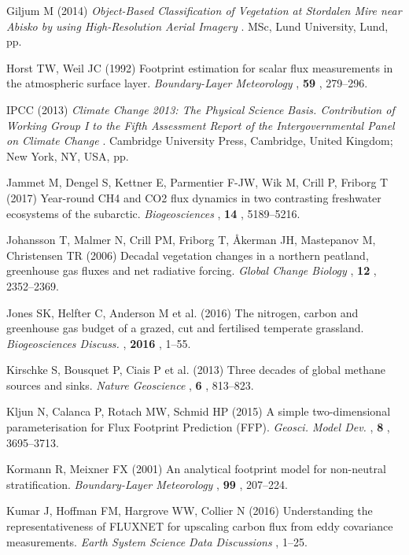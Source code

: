 \hypertarget{ref-Giljum2014}{}
Giljum M (2014) \emph{\textup{Object-Based Classification of Vegetation
at Stordalen Mire near Abisko by using High-Resolution Aerial Imagery}} .
MSc, Lund University, Lund, pp.

\hypertarget{ref-Horst1992}{}
Horst TW, Weil JC (1992) Footprint estimation for scalar flux
measurements in the atmospheric surface layer. \emph{Boundary-Layer
Meteorology} , \textbf{59} , 279--296.

\hypertarget{ref-IPCC2013}{}
IPCC (2013) \emph{\textup{Climate Change 2013: The Physical Science
Basis. Contribution of Working Group I to the Fifth Assessment Report of
the Intergovernmental Panel on Climate Change}} . Cambridge University
Press, Cambridge, United Kingdom; New York, NY, USA, pp.

\hypertarget{ref-Jammet2017}{}
Jammet M, Dengel S, Kettner E, Parmentier F-JW, Wik M, Crill P, Friborg
T (2017) Year-round CH4 and CO2 flux dynamics in two contrasting
freshwater ecosystems of the subarctic. \emph{Biogeosciences} ,
\textbf{14} , 5189--5216.

\hypertarget{ref-Johansson2006}{}
Johansson T, Malmer N, Crill PM, Friborg T, Åkerman JH, Mastepanov M,
Christensen TR (2006) Decadal vegetation changes in a northern peatland,
greenhouse gas fluxes and net radiative forcing. \emph{Global Change
Biology} , \textbf{12} , 2352--2369.

\hypertarget{ref-Jones2016}{}
Jones SK, Helfter C, Anderson M et al. (2016) The nitrogen, carbon and
greenhouse gas budget of a grazed, cut and fertilised temperate
grassland. \emph{Biogeosciences Discuss.} , \textbf{2016} , 1--55.

\hypertarget{ref-Kirschke2013}{}
Kirschke S, Bousquet P, Ciais P et al. (2013) Three decades of global
methane sources and sinks. \emph{Nature Geoscience} , \textbf{6} ,
813--823.

\hypertarget{ref-Kljun2015}{}
Kljun N, Calanca P, Rotach MW, Schmid HP (2015) A simple two-dimensional
parameterisation for Flux Footprint Prediction (FFP). \emph{Geosci.
Model Dev.} , \textbf{8} , 3695--3713.

\hypertarget{ref-Kormann2001}{}
Kormann R, Meixner FX (2001) An analytical footprint model for
non-neutral stratification. \emph{Boundary-Layer Meteorology} ,
\textbf{99} , 207--224.

\hypertarget{ref-Kumar2016}{}
Kumar J, Hoffman FM, Hargrove WW, Collier N (2016) Understanding the
representativeness of FLUXNET for upscaling carbon flux from eddy
covariance measurements. \emph{Earth System Science Data Discussions} ,
1--25.


